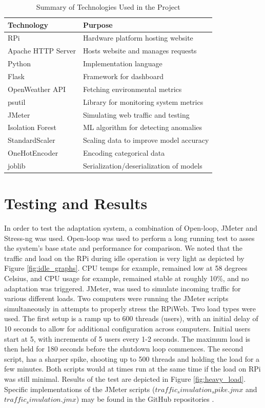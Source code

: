 \documentclass[conference]{IEEEtran}
\begin{document}
\begin{table}[ht]
    \centering
    \caption{Summary of Technologies Used in the Project}
    \label{tab:technologies}
    \small
    \begin{tabular}{ll}
    \toprule
    \textbf{Technology} & \textbf{Purpose} \\
    \midrule
    RPi                    & Hardware platform hosting website \\
    Apache HTTP Server     & Hosts website and manages requests \\
    Python                 & Implementation language \\
    Flask                  & Framework for dashboard \\
    OpenWeather API        & Fetching environmental metrics \\
    psutil                 & Library for monitoring system metrics \\
    JMeter                 & Simulating web traffic and testing \\
    Isolation Forest       & ML algorithm for detecting anomalies \\
    StandardScaler         & Scaling data to improve model accuracy \\
    OneHotEncoder          & Encoding categorical data \\
    joblib                 & Serialization/deserialization of models \\
    \bottomrule
    \end{tabular}
    \end{table}
    
\section{\textbf{Testing and Results}}\label{test_and_results}
In order to test the adaptation system, a combination of Open-loop, JMeter and Stress-ng was used. Open-loop was used to perform a long running test to asses the system's base state and performance for comparison. We noted that the traffic and load on the RPi during idle operation is very light as depicted by Figure \ref{fig:idle_graphs}. CPU temps for example, remained low at 58 degrees Celsius, and CPU usage for example, remained stable at roughly 10\%, and no adaptation was triggered. JMeter, was used to simulate incoming traffic for various different loads. Two computers were running the JMeter scripts simultaneously in attempts to properly stress the RPiWeb. Two load types were used. The first setup is a ramp up to 600 threads (users), with an initial delay of 10 seconds to allow for additional configuration across computers. Initial users start at 5, with increments of 5 users every 1-2 seconds. The maximum load is then held for 180 seconds before the shutdown loop commences. The second script, has a sharper spike, shooting up to 500 threads and holding the load for a few minutes. Both scripts would at times run at the same time if the load on RPi was still minimal. Results of the test are depicted in Figure \ref{fig:heavy_load}. Specific implementations of the JMeter scripts ($traffic_simulation_spike.jmx$ and $traffic_simulation.jmx$) may be found in the GitHub repositories \cite{arthur_github}.
\end{document}
